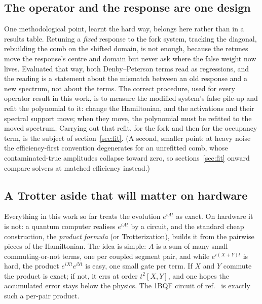 \documentclass[11pt,a4paper]{article}
\begin{document}
\subsection{The operator and the response are one design}
\label{sec:fork:nogo}

One methodological point, learnt the hard way, belongs here rather
than in a results table. Retuning a \emph{fixed} response to the fork
system, tracking the diagonal, rebuilding the comb on the shifted
domain, is not enough, because the retunes move the response's
centre and domain but never ask where the false weight now lives.
Evaluated that way, both Denby--Peterson terms read as regressions,
and the reading is a statement about the mismatch between an old
response and a new spectrum, not about the terms. The correct
procedure, used for every operator result in this work, is to
measure the modified system's false pile-up and refit the polynomial
to it: change the Hamiltonian, and the activations and their spectral
support move; when they move, the polynomial must be refitted to the
moved spectrum. Carrying out that refit, for the fork and then for
the occupancy term, is the subject of section~\ref{sec:fit}. (A
second, smaller point: at heavy noise the efficiency-first convention
degenerates for an unrefitted comb, whose contaminated-true
amplitudes collapse toward zero, so sections~\ref{sec:fit} onward
compare solvers at matched efficiency instead.)

\subsection{A Trotter aside that will matter on hardware}
\label{sec:fork:trotter}

Everything in this work so far treats the evolution $e^{iAt}$ as
exact. On hardware it is not: a quantum computer realises $e^{iAt}$
by a circuit, and the standard cheap construction, the
\emph{product formula} (or Trotterization), builds it from the
pairwise pieces of the Hamiltonian. The idea is simple: $A$ is a sum
of many small commuting-or-not terms, one per coupled segment pair,
and while $e^{i(X+Y)t}$ is hard, the product
$e^{iXt}e^{iYt}$ is easy, one small gate per term. If $X$ and $Y$
commute the product is exact; if not, it errs at order $t^2[X,Y]$,
and one hopes the accumulated error stays below the physics. The
1BQF circuit of ref.~\cite{trackhhl} is exactly such a per-pair
product.
\end{document}

